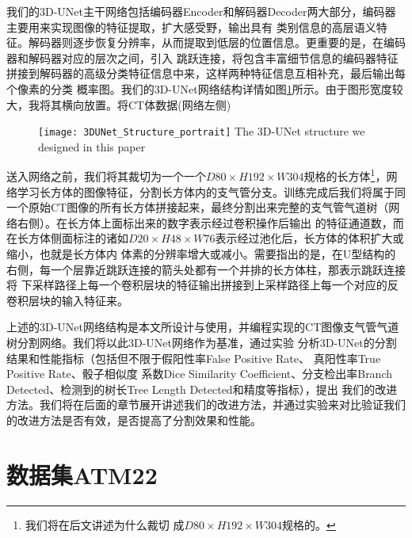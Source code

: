 我们的3D-UNet主干网络包括编码器Encoder和解码器Decoder两大部分，编码器主要用来实现图像的特征提取，扩大感受野，输出具有
类别信息的高层语义特征。解码器则逐步恢复分辨率，从而提取到低层的位置信息。更重要的是，在编码器和解码器对应的层次之间，引入
跳跃连接，将包含丰富细节信息的编码器特征拼接到解码器的高级分类特征信息中来，这样两种特征信息互相补充，最后输出每个像素的分类
概率图。我们的3D-UNet网络结构详情如图\ref{fig:3DUNetStructure}所示。由于图形宽度较大，我将其横向放置。将CT体数据(网络左侧)
\begin{figure}[ht]
    \centering
    \texttt{[image: 3DUNet\_Structure\_portrait]}
        {The 3D-UNet structure we designed in this paper}
    \label{fig:3DUNetStructure}
\end{figure}
送入网络之前，我们将其裁切为一个一个$D80 \times H192 \times W304$规格的长方体\footnote{我们将在后文讲述为什么裁切
成$D80 \times H192 \times W304$规格的。}，网络学习长方体的图像特征，分割长方体内的支气管分支。训练完成后我们将属于同
一个原始CT图像的所有长方体拼接起来，最终分割出来完整的支气管气道树（网络右侧）。在长方体上面标出来的数字表示经过卷积操作后输出
的特征通道数，而在长方体侧面标注的诸如$D20 \times H48 \times W76$表示经过池化后，长方体的体积扩大或缩小，也就是长方体内
体素的分辨率增大或减小。需要指出的是，在U型结构的右侧，每一个层靠近跳跃连接的箭头处都有一个并排的长方体柱，那表示跳跃连接将
下采样路径上每一个卷积层块的特征输出拼接到上采样路径上每一个对应的反卷积层块的输入特征来。

上述的3D-UNet网络结构是本文所设计与使用，并编程实现的CT图像支气管气道树分割网络。我们将以此3D-UNet网络作为基准，通过实验
分析3D-UNet的分割结果和性能指标（包括但不限于假阳性率False Positive Rate、 真阳性率True Positive Rate、骰子相似度
系数Dice Similarity Coefficient、分支检出率Branch Detected、检测到的树长Tree Length Detected和精度等指标），提出
我们的改进方法。我们将在后面的章节展开讲述我们的改进方法，并通过实验来对比验证我们的改进方法是否有效，是否提高了分割效果和性能。

\section{数据集ATM22}
